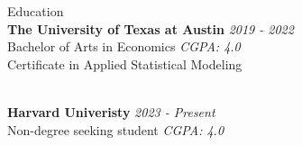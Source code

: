 \documentclass{resume} %
\begin{document}

\begin{rSection}{Education}
\\{\bf The University of Texas at Austin} \hfill {\em 2019 - 2022} 
\\ Bachelor of Arts in Economics \hfill {\em CGPA: 4.0}
\\ Certificate in Applied Statistical Modeling \smallskip

\\{\bf Harvard Univeristy} \hfill {\em 2023 - Present} 
\\ Non-degree seeking student \hfill {\em CGPA: 4.0}


\end{rSection}
\end{document}
